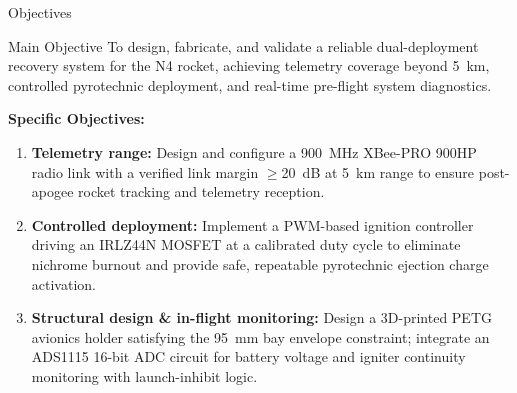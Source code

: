 \documentclass[aspectratio=169, 11pt]{beamer}
\begin{document}
\begin{frame}{Objectives}
\begin{block}{Main Objective}
To design, fabricate, and validate a reliable dual-deployment recovery system for
the N4 rocket, achieving telemetry coverage beyond 5~km, controlled pyrotechnic
deployment, and real-time pre-flight system diagnostics.
\end{block}
\vspace{0.5em}
\textbf{Specific Objectives:}
\begin{enumerate}
  \item \textbf{Telemetry range:} Design and configure a 900~MHz XBee-PRO 900HP radio link
        with a verified link margin $\geq$20~dB at 5~km range to ensure post-apogee
        rocket tracking and telemetry reception.
  \item \textbf{Controlled deployment:} Implement a PWM-based ignition controller driving
        an IRLZ44N MOSFET at a calibrated duty cycle to eliminate nichrome burnout and
        provide safe, repeatable pyrotechnic ejection charge activation.
  \item \textbf{Structural design \& in-flight monitoring:} Design a 3D-printed PETG
        avionics holder satisfying the 95~mm bay envelope constraint; integrate an
        ADS1115 16-bit ADC circuit for battery voltage and igniter continuity monitoring
        with launch-inhibit logic.
\end{enumerate}
\end{frame}
\end{document}
